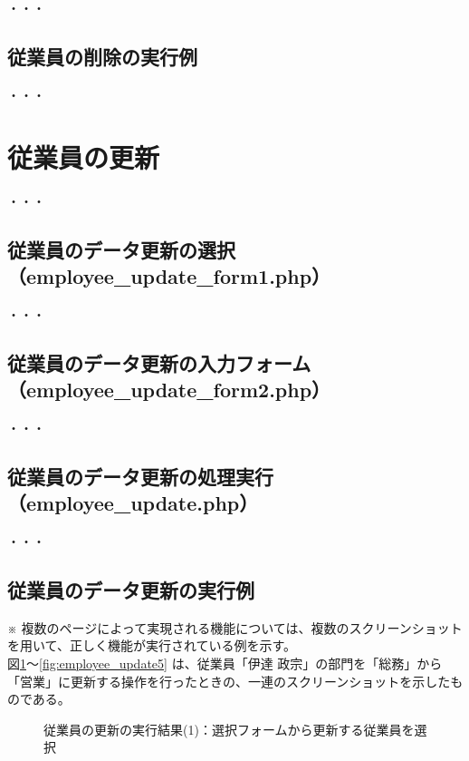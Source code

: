 \documentclass[a4j,12pt]{jreport}
\begin{document}
・・・

\subsection{従業員の削除の実行例}

・・・


\section{従業員の更新}

・・・

\subsection{従業員のデータ更新の選択（employee\_update\_form1.php）}

・・・

\subsection{従業員のデータ更新の入力フォーム（employee\_update\_form2.php）}

・・・

\subsection{従業員のデータ更新の処理実行（employee\_update.php）}

・・・


\subsection{従業員のデータ更新の実行例}

※ 複数のページによって実現される機能については、複数のスクリーンショットを用いて、正しく機能が実行されている例を示す。\\

図\ref{fig:employee_update1}～\ref{fig:employee_update5} は、従業員「伊達 政宗」の部門を「総務」から「営業」に更新する操作を行ったときの、一連のスクリーンショットを示したものである。

\begin{figure}[h]
	\begin{center}
	\end{center}
	\caption{従業員の更新の実行結果(1)：選択フォームから更新する従業員を選択
	}
	\label{fig:employee_update1}
\end{figure}
\end{document}
